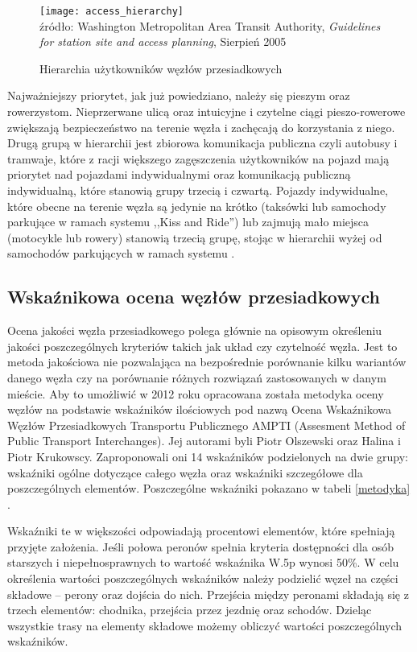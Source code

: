 \documentclass[twoside,12pt]{article}
\begin{document}
	\begin{figure}[H]
		\centering
		\caption{Hierarchia użytkowników węzłów przesiadkowych}
		\texttt{[image: access\_hierarchy]}\\
		\footnotesize{źródło: Washington Metropolitan Area Transit Authority, \emph{Guidelines for station site and access planning}, Sierpień 2005 \cite{guidelines_washington}}
		\label{access-hierarchy}
	\end{figure}
	
	Najważniejszy priorytet, jak już powiedziano, należy się pieszym oraz rowerzystom. Nieprzerwane ulicą oraz intuicyjne i czytelne ciągi pieszo-rowerowe zwiększają bezpieczeństwo na terenie węzła i zachęcają do korzystania z niego. Drugą grupą w hierarchii jest zbiorowa komunikacja publiczna czyli autobusy i tramwaje, które z racji większego zagęszczenia użytkowników na pojazd mają priorytet nad pojazdami indywidualnymi oraz komunikacją publiczną indywidualną, które stanowią grupy trzecią i czwartą. Pojazdy indywidualne, które obecne na terenie węzła są jedynie na krótko (taksówki lub samochody parkujące w ramach systemu ,,Kiss and Ride'') lub zajmują mało miejsca (motocykle lub rowery) stanowią trzecią grupę, stojąc w hierarchii wyżej od samochodów parkujących w ramach systemu \pnr{} \cite{guidelines_washington}.
	
	\clearpage
	\subsection{Wskaźnikowa ocena węzłów przesiadkowych}
	
	Ocena jakości węzła przesiadkowego polega głównie na opisowym określeniu jakości poszczególnych kryteriów takich jak układ czy czytelność węzła. Jest to metoda jakościowa nie pozwalająca na bezpośrednie porównanie kilku wariantów danego węzła czy na porównanie różnych rozwiązań zastosowanych w danym mieście. Aby to umożliwić w 2012 roku opracowana została metodyka oceny węzłów na podstawie wskaźników ilościowych pod nazwą Ocena Wskaźnikowa Węzłów Przesiadkowych Transportu Publicznego AMPTI (Assesment Method of Public Transport Interchanges). Jej autorami byli Piotr Olszewski oraz Halina i Piotr Krukowscy. Zaproponowali oni 14 wskaźników podzielonych na dwie grupy: wskaźniki ogólne dotyczące całego węzła oraz wskaźniki szczegółowe dla poszczególnych elementów. Poszczególne wskaźniki pokazano w tabeli \ref{metodyka} \cite{metodyka}. 
	
	Wskaźniki te w większości odpowiadają procentowi elementów, które spełniają przyjęte założenia. Jeśli połowa peronów spełnia kryteria dostępności dla osób starszych i niepełnosprawnych to wartość wskaźnika W.5p wynosi 50\%. W celu określenia wartości poszczególnych wskaźników należy podzielić węzeł na części składowe -- perony oraz dojścia do nich. Przejścia między peronami składają się z trzech elementów: chodnika, przejścia przez jezdnię oraz schodów. Dzieląc wszystkie trasy na elementy składowe możemy obliczyć wartości poszczególnych wskaźników.
	
\end{document}

